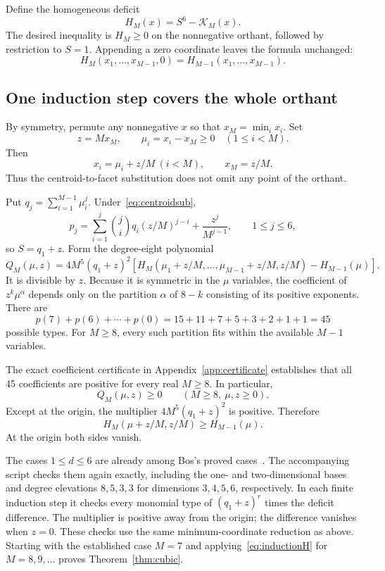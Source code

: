 \documentclass[11pt,a4paper]{article}
\theoremstyle{remark}
\begin{document}
Define the homogeneous deficit
\[
 H_M(x)=S^6-\mathcal K_M(x).
\]
The desired inequality is $H_M\ge0$ on the nonnegative orthant, followed by restriction to $S=1$. Appending a zero coordinate leaves the formula unchanged:
\[
 H_M(x_1,\ldots,x_{M-1},0)=H_{M-1}(x_1,\ldots,x_{M-1}).
\]

\subsection{One induction step covers the whole orthant}

By symmetry, permute any nonnegative $x$ so that $x_M=\min_i x_i$. Set
\[
 z=Mx_M,\qquad \mu_i=x_i-x_M\ge0\quad(1\le i<M).
\]
Then
\begin{equation}\label{eq:centroidsub}
 x_i=\mu_i+z/M\ (i<M),\qquad x_M=z/M.
\end{equation}
Thus the centroid-to-facet substitution does not omit any point of the orthant.

Put $q_j=\sum_{i=1}^{M-1}\mu_i^j$. Under~\eqref{eq:centroidsub},
\begin{equation}\label{eq:pq}
 p_j=\sum_{i=1}^j\binom ji q_i(z/M)^{j-i}+\frac{z^j}{M^{j-1}},
 \qquad 1\le j\le6,
\end{equation}
so $S=q_1+z$. Form the degree-eight polynomial
\begin{equation}\label{eq:Q}
 Q_M(\mu,z)=4M^5(q_1+z)^2
 \left[H_M(\mu_1+z/M,\ldots,\mu_{M-1}+z/M,z/M)
       -H_{M-1}(\mu)\right].
\end{equation}
It is divisible by $z$. Because it is symmetric in the $\mu$ variables, the coefficient of $z^k\mu^\alpha$ depends only on the partition $\alpha$ of $8-k$ consisting of its positive exponents. There are
\[
 p(7)+p(6)+\cdots+p(0)=15+11+7+5+3+2+1+1=45
\]
possible types. For $M\ge8$, every such partition fits within the available $M-1$ variables.

The exact coefficient certificate in Appendix~\ref{app:certificate} establishes that all 45 coefficients are positive for every real $M\ge8$. In particular,
\[
 Q_M(\mu,z)\ge0\qquad(M\ge8,\ \mu,z\ge0).
\]
Except at the origin, the multiplier $4M^5(q_1+z)^2$ is positive. Therefore
\begin{equation}\label{eq:inductionH}
 H_M(\mu+z/M,z/M)\ge H_{M-1}(\mu).
\end{equation}
At the origin both sides vanish.

The cases $1\le d\le6$ are already among Bos's proved cases~\cite[Proposition 3.1]{bos}. The accompanying script checks them again exactly, including the one- and two-dimensional bases and degree elevations $8,5,3,3$ for dimensions $3,4,5,6$, respectively. In each finite induction step it checks every monomial type of $(q_1+z)^r$ times the deficit difference. The multiplier is positive away from the origin; the difference vanishes when $z=0$. These checks use the same minimum-coordinate reduction as above. Starting with the established case $M=7$ and applying~\eqref{eq:inductionH} for $M=8,9,\ldots$ proves Theorem~\ref{thm:cubic}.
\end{document}
